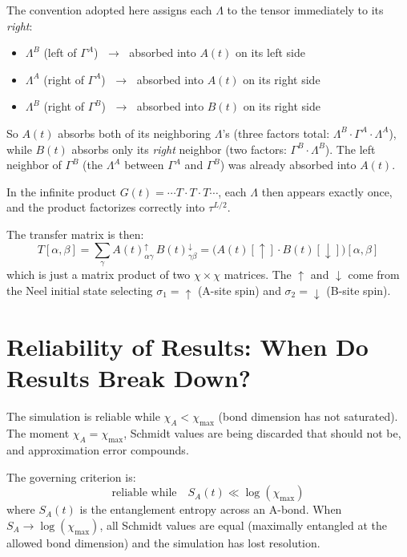 \documentclass[11pt, a4paper]{article}
\begin{document}
The convention adopted here assigns each $\Lambda$ to the tensor immediately to its \emph{right}:
\begin{itemize}
  \item $\Lambda^B$ (left of $\Gamma^A$) $\;\to\;$ absorbed into $A(t)$ on its left side
  \item $\Lambda^A$ (right of $\Gamma^A$) $\;\to\;$ absorbed into $A(t)$ on its right side
  \item $\Lambda^B$ (right of $\Gamma^B$) $\;\to\;$ absorbed into $B(t)$ on its right side
\end{itemize}
So $A(t)$ absorbs both of its neighboring $\Lambda$'s (three factors total: $\Lambda^B \cdot \Gamma^A \cdot \Lambda^A$), while $B(t)$ absorbs only its \emph{right} neighbor (two factors: $\Gamma^B \cdot \Lambda^B$). The left neighbor of $\Gamma^B$ (the $\Lambda^A$ between $\Gamma^A$ and $\Gamma^B$) was already absorbed into $A(t)$.

In the infinite product $G(t) = \cdots T \cdot T \cdot T \cdots$, each $\Lambda$ then appears exactly once, and the product factorizes correctly into $\tau^{L/2}$.

The transfer matrix is then:
\begin{equation}
  T[\alpha, \beta] = \sum_\gamma A(t)^{\uparrow}_{\alpha\gamma}\, B(t)^{\downarrow}_{\gamma\beta}
  = \bigl(A(t)[\uparrow] \cdot B(t)[\downarrow]\bigr)[\alpha, \beta]
  \label{eq:transfer_matrix}
\end{equation}
which is just a matrix product of two $\chi \times \chi$ matrices. The $\uparrow$ and $\downarrow$ come from the Neel initial state selecting $\sigma_1 = \uparrow$ (A-site spin) and $\sigma_2 = \downarrow$ (B-site spin).

\section{Reliability of Results: When Do Results Break Down?}

The simulation is reliable while $\chi_A < \chi_{\max}$ (bond dimension has not saturated). The moment $\chi_A = \chi_{\max}$, Schmidt values are being discarded that should not be, and approximation error compounds.

The governing criterion is:
\begin{equation}
  \text{reliable while} \quad S_A(t) \ll \log(\chi_{\max})
\end{equation}
where $S_A(t)$ is the entanglement entropy across an A-bond. When $S_A \to \log(\chi_{\max})$, all Schmidt values are equal (maximally entangled at the allowed bond dimension) and the simulation has lost resolution.
\end{document}
